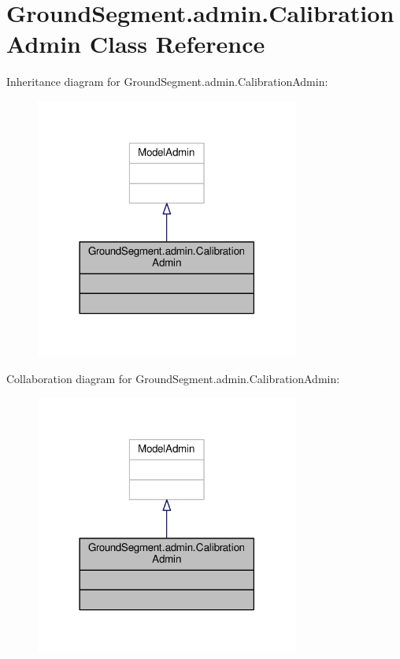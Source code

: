 \hypertarget{class_ground_segment_1_1admin_1_1_calibration_admin}{}\section{Ground\+Segment.\+admin.\+Calibration\+Admin Class Reference}
\label{class_ground_segment_1_1admin_1_1_calibration_admin}


Inheritance diagram for Ground\+Segment.\+admin.\+Calibration\+Admin\+:\nopagebreak
\begin{figure}[H]
\begin{center}
\leavevmode
\includegraphics[width=246pt]{class_ground_segment_1_1admin_1_1_calibration_admin__inherit__graph}
\end{center}
\end{figure}


Collaboration diagram for Ground\+Segment.\+admin.\+Calibration\+Admin\+:\nopagebreak
\begin{figure}[H]
\begin{center}
\leavevmode
\includegraphics[width=246pt]{class_ground_segment_1_1admin_1_1_calibration_admin__coll__graph}
\end{center}
\end{figure}


